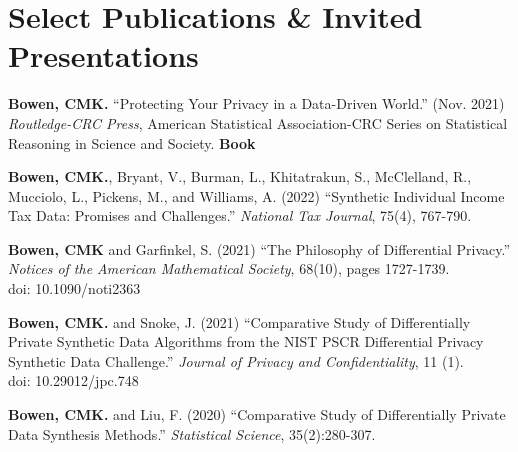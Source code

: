 \documentclass[12, letterpaper, roman]{moderncv} %
\begin{document}

\newpage
\section{Select Publications \& Invited Presentations}
\begin{etaremune}[topsep=0pt, itemsep=4pt, partopsep=0pt, parsep=0pt]

    \item \textbf{Bowen, CMK.} ``Protecting Your Privacy in a Data-Driven World.'' (Nov. 2021) \textit{Routledge-CRC Press}, American Statistical Association-CRC Series on Statistical Reasoning in Science and Society. \textbf{Book}
    
    \item \textbf{Bowen, CMK.}, Bryant, V., Burman, L., Khitatrakun, S., McClelland, R., Mucciolo, L., Pickens, M., and Williams, A. (2022) ``Synthetic Individual Income Tax Data: Promises and Challenges.'' \textit{National Tax Journal}, 75(4), 767-790.
    
    \item \textbf{Bowen, CMK} and Garfinkel, S. (2021) ``The Philosophy of Differential Privacy.'' \textit{Notices of the American Mathematical Society}, 68(10), pages 1727-1739.\\
    doi: 10.1090/noti2363

    \item \textbf{Bowen, CMK.} and Snoke, J. (2021) ``Comparative Study of Differentially Private Synthetic Data Algorithms from the NIST PSCR Differential Privacy Synthetic Data Challenge.'' \textit{Journal of Privacy and Confidentiality}, 11 (1).\\
    doi: 10.29012/jpc.748

    \item \textbf{Bowen, CMK.} and Liu, F. (2020) ``Comparative Study of Differentially Private Data Synthesis Methods.'' \textit{Statistical Science}, 35(2):280-307.

\end{etaremune}
\end{document}
